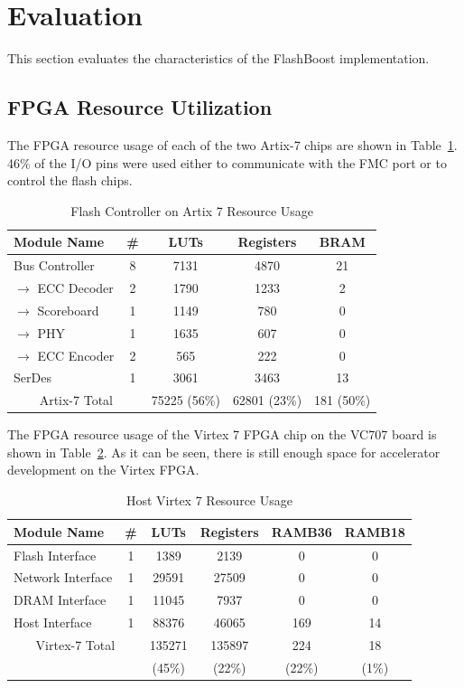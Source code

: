 \section{Evaluation}
\label{sec:results}

This section evaluates the characteristics of the FlashBoost implementation.

\subsection{FPGA Resource Utilization}

The FPGA resource usage of each of the two Artix-7 chips are shown in
Table~\ref{tab:artixutil}. 46\% of the I/O pins were used either to communicate
with the FMC port or to control the flash chips.

\begin{table}[h]\footnotesize
\centering
\begin{tabular}{l | c | c | c | c |}
Module Name & \# & LUTs & Registers & BRAM \\
\hline \hline
Bus Controller & 8 & 7131 & 4870 & 21 \\
$\rightarrow$ ECC Decoder & 2 & 1790 & 1233 & 2 \\
$\rightarrow$ Scoreboard & 1 & 1149 & 780 & 0 \\
$\rightarrow$ PHY & 1 & 1635 & 607 & 0 \\
$\rightarrow$ ECC Encoder & 2 & 565 & 222 & 0 \\
\hline
SerDes & 1 & 3061 & 3463 & 13 \\
\hline \hline
\multicolumn{2}{c}{
Artix-7 Total
} & 75225 (56\%) & 62801 (23\%) & 181 (50\%)
\end{tabular}
\caption{Flash Controller on Artix 7 Resource Usage}
\label{tab:artixutil}
\end{table}

The FPGA resource usage of the Virtex 7 FPGA chip on the VC707 board is shown in
Table~\ref{tab:virtexutil}. As it can be seen, there is still enough space for accelerator development on the Virtex FPGA.



\begin{table}[h]\footnotesize
\centering
\begin{tabular}{l | c | c | c | c | c |}
Module Name & \# & LUTs & Registers & RAMB36 & RAMB18 \\
\hline \hline
Flash Interface & 1 & 1389 & 2139 & 0 & 0 \\
Network Interface& 1 & 29591 & 27509 & 0 & 0\\
DRAM Interface& 1 & 11045 & 7937 & 0  & 0\\
Host Interface& 1 & 88376 & 46065 & 169 & 14 \\
\hline \hline
\multicolumn{2}{c}{
Virtex-7 Total
} & 135271& 135897 & 224 & 18 \\
\multicolumn{2}{c}{
} & (45\%) & (22\%) & (22\%) & (1\%)
\end{tabular}
\caption{Host Virtex 7 Resource Usage}
\label{tab:virtexutil}
\end{table}


